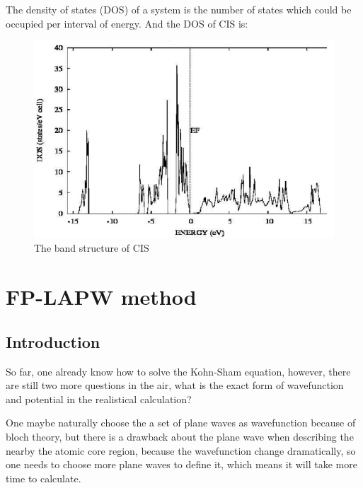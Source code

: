 \documentclass[a4paper, 12pt, titlepage,oneside,drop]{kthesis}
\begin{document}
\noindent The density of states (DOS) of a system is the number of states which could be occupied per interval of energy. And the DOS of CIS is: 

\begin{figure}[h]\label{doscis}
\begin{center}
\includegraphics[scale=0.4]{doscis.png}
\caption{The band structure of CIS}
\end{center}
\end{figure}





\chapter{FP-LAPW method}
\section{Introduction}
\noindent So far, one already know how to solve the Kohn-Sham equation, however, there are still two more questions in the air, what is the exact form of 
wavefunction and potential in the realistical calculation?  

\noindent One maybe naturally choose the a set of plane waves as wavefunction because of bloch theory, but there is a drawback about the plane wave 
when describing the nearby the atomic core region, because the wavefunction change dramatically, so one needs to choose more plane
waves to define it, which means it will take more time to calculate.
\end{document}
